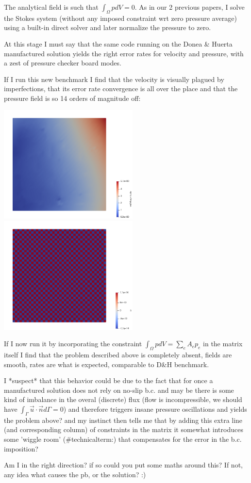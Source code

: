 \documentclass[a4paper,12pt]{article}
\begin{document}
The analytical field is such that $\int_\Omega p dV= 0$.
As in our 2 previous papers, I solve the Stokes system (without 
any imposed constraint wrt zero pressure average) using a built-in direct solver
and later normalize the pressure to zero.

At this stage I must say that the same code running on the Donea \& Huerta manufactured
solution yields the right error rates for velocity and pressure, with a zest of pressure 
checker board modes.

If I run this new benchmark I find that the velocity is visually plagued by imperfections, 
that its error rate convergence is all over the place and that the pressure field 
is so 14 orders of magnitude off:

\begin{center}
\includegraphics[width=7cm]{../results/exp09/velpb.png}
\includegraphics[width=7cm]{../results/exp09/presspb.png}
\end{center}

If I now run it by incorporating the constraint $\int_\Omega p dV = \sum_e A_e p_e$ in the 
matrix itself I find that the problem described above is completely absent, fields are smooth, 
rates are what is expected, comparable to D\&H benchmark. 

I *suspect* that this behavior could be due to the fact that for once a manufactured solution 
does not rely on no-slip b.c. and may be there is some kind of imbalance in the overal (discrete)
flux (flow is incompressible, we should have $\int_\Gamma \vec{u}\cdot\vec{n}d\Gamma=0$) 
and therefore triggers insane pressure oscillations and 
yields the problem above? and my instinct then tells me that 
by adding this extra line (and corresponding column) of constraints in the matrix it somewhat 
introduces some 'wiggle room' (\#technicalterm:) that compensates for the error in the b.c. imposition?
 
Am I in the right direction? if so could you put some maths around this? 
If not, any idea what causes the pb, or the solution? :)
 
\end{document}
